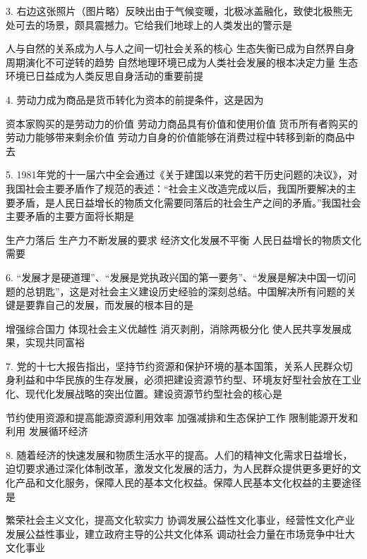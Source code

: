 3. 右边这张照片（图片略）反映出由于气候变暖，北极冰盖融化，致使北极熊无处可去的场景，颇具震撼力。它给我们地球上的人类发出的警示是
\begin{choices}
	 人与自然的关系成为人与人之间一切社会关系的核心
	 生态失衡已成为自然界自身周期演化不可逆转的趋势
	 自然地理环境已成为人类社会发展的根本决定力量
	 生态环境已日益成为人类反思自身活动的重要前提
\end{choices}
4. 劳动力成为商品是货币转化为资本的前提条件，这是因为
\begin{choices}
	 资本家购买的是劳动力的价值
	 劳动力商品具有价值和使用价值
	 货币所有者购买的劳动力能够带来剩余价值
	 劳动力自身的价值能够在消费过程中转移到新的商品中去
\end{choices}
5. 1981年党的十一届六中全会通过《关于建国以来党的若干历史问题的决议》，对我国社会主要矛盾作了规范的表述：“社会主义改造完成以后，我国所要解决的主要矛盾，是人民日益增长的物质文化需要同落后的社会生产之间的矛盾。”我国社会主要矛盾的主要方面将长期是
\begin{choices}
	 生产力落后
	 生产力不断发展的要求
	 经济文化发展不平衡
	 人民日益增长的物质文化需要
\end{choices}
6. “发展才是硬道理”、“发展是党执政兴国的第一要务”、“发展是解决中国一切问题的总钥匙”，这是对社会主义建设历史经验的深刻总结。中国解决所有问题的关键是要靠自己的发展，而发展的根本目的是
\begin{choices}
	 增强综合国力
	 体现社会主义优越性
	 消灭剥削，消除两极分化
	 使人民共享发展成果，实现共同富裕
\end{choices}
7. 党的十七大报告指出，坚持节约资源和保护环境的基本国策，关系人民群众切身利益和中华民族的生存发展，必须把建设资源节约型、环境友好型社会放在工业化、现代化发展战略的突出位置。建设资源节约型社会的核心是
\begin{choices}
	 节约使用资源和提高能源资源利用效率
	 加强减排和生态保护工作
	 限制能源开发和利用
	 发展循环经济
\end{choices}
8. 随着经济的快速发展和物质生活水平的提高。人们的精神文化需求日益增长，迫切要求通过深化体制改革，激发文化发展的活力，为人民群众提供更多更好的文化产品和文化服务，保障人民的基本文化权益。保障人民基本文化权益的主要途径是
\begin{choices}
	 繁荣社会主义文化，提高文化软实力
	 协调发展公益性文化事业，经营性文化产业
	 发展公益性事业，建立政府主导的公共文化体系
	 调动社会力量在市场竞争中壮大文化事业
\end{choices}
